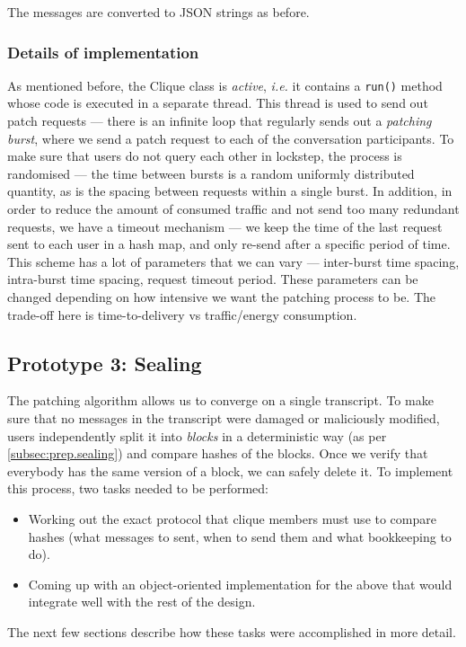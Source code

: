 \documentclass[a4paper, 12pt]{report}
\begin{document}
The messages are converted to JSON strings as before.


\subsubsection{Details of implementation}
As mentioned before, the Clique class is \emph{active}, \textit{i.e.} it contains a \texttt{run()} method whose code is executed in a separate thread. This thread is used to send out patch requests --- there is an infinite loop that regularly sends out a \emph{patching burst}, where we send a patch request to each of the conversation participants. To make sure that users do not query each other in lockstep, the process is randomised --- the time between bursts is a random uniformly distributed quantity, as is the spacing between requests within a single burst. In addition, in order to reduce the amount of consumed traffic and not send too many redundant requests, we have a timeout mechanism --- we keep the time of the last request sent to each user in a hash map, and only re-send after a specific period of time. \\

This scheme has a lot of parameters that we can vary --- inter-burst time spacing, intra-burst time spacing, request timeout period. These parameters can be changed depending on how intensive we want the patching process to be. The trade-off here is time-to-delivery vs traffic/energy consumption. 


\subsection{Prototype 3: Sealing}
\label{subsec:impl.proto.sealing}
The patching algorithm allows us to converge on a single transcript. To make sure that no messages in the transcript were damaged or maliciously modified, users independently split it into \emph{blocks} in a deterministic way (as per \cref{subsec:prep.sealing}) and compare hashes of the blocks. Once we verify that everybody has the same version of a block, we can safely delete it. To implement this process, two tasks needed to be performed:

\begin{itemize}
    \item Working out the exact protocol that clique members must use to compare hashes (what messages to sent, when to send them and what bookkeeping to do).
    \item Coming up with an object-oriented implementation for the above that would integrate well with the rest of the design.
\end{itemize}
The next few sections describe how these tasks were accomplished in more detail.
\end{document}

